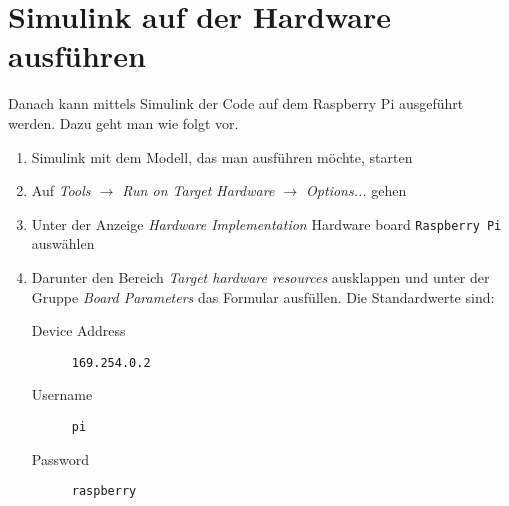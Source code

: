 \documentclass[a4paper]{article}
\begin{document}
\section*{Simulink auf der Hardware ausführen}
Danach kann mittels Simulink der Code auf dem Raspberry Pi ausgeführt werden. Dazu geht man wie folgt vor.
\begin{enumerate}
	\item Simulink mit dem Modell, das man ausführen möchte, starten
	\item Auf \textit{Tools $\rightarrow$ Run on Target Hardware $\rightarrow$ Options...} gehen
	\item Unter der Anzeige \textit{Hardware Implementation} Hardware board \verb|Raspberry Pi| auswählen
	\item Darunter den Bereich \textit{Target hardware resources} ausklappen und unter der Gruppe \textit{Board Parameters} das Formular ausfüllen. Die Standardwerte sind:
	\begin{description}
		\item[Device Address] \verb|169.254.0.2|
		\item[Username] \verb|pi|
		\item[Password] \verb|raspberry|
	\end{description}
\end{enumerate}	
	
	
\end{document}
